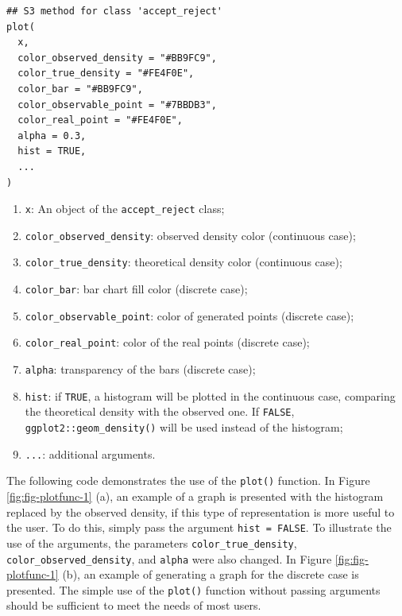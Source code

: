 \begin{verbatim}
## S3 method for class 'accept_reject'
plot(
  x,
  color_observed_density = "#BB9FC9",
  color_true_density = "#FE4F0E",
  color_bar = "#BB9FC9",
  color_observable_point = "#7BBDB3",
  color_real_point = "#FE4F0E",
  alpha = 0.3,
  hist = TRUE,
  ...
)
\end{verbatim}

\begin{enumerate}
\def\labelenumi{\arabic{enumi}.}
\tightlist
\item
  \texttt{x}: An object of the \texttt{accept\_reject} class;
\item
  \texttt{color\_observed\_density}: observed density color (continuous case);
\item
  \texttt{color\_true\_density}: theoretical density color (continuous case);
\item
  \texttt{color\_bar}: bar chart fill color (discrete case);
\item
  \texttt{color\_observable\_point}: color of generated points (discrete case);
\item
  \texttt{color\_real\_point}: color of the real points (discrete case);
\item
  \texttt{alpha}: transparency of the bars (discrete case);
\item
  \texttt{hist}: if \texttt{TRUE}, a histogram will be plotted in the continuous case, comparing the theoretical density with the observed one. If \texttt{FALSE}, \texttt{ggplot2::geom\_density()} will be used instead of the histogram;
\item
  \texttt{...}: additional arguments.
\end{enumerate}

The following code demonstrates the use of the \texttt{plot()} function. In Figure \ref{fig:fig-plotfunc-1} (a), an example of a graph is presented with the histogram replaced by the observed density, if this type of representation is more useful to the user. To do this, simply pass the argument \texttt{hist\ =\ FALSE}. To illustrate the use of the arguments, the parameters \texttt{color\_true\_density}, \texttt{color\_observed\_density}, and \texttt{alpha} were also changed. In Figure \ref{fig:fig-plotfunc-1} (b), an example of generating a graph for the discrete case is presented. The simple use of the \texttt{plot()} function without passing arguments should be sufficient to meet the needs of most users.

